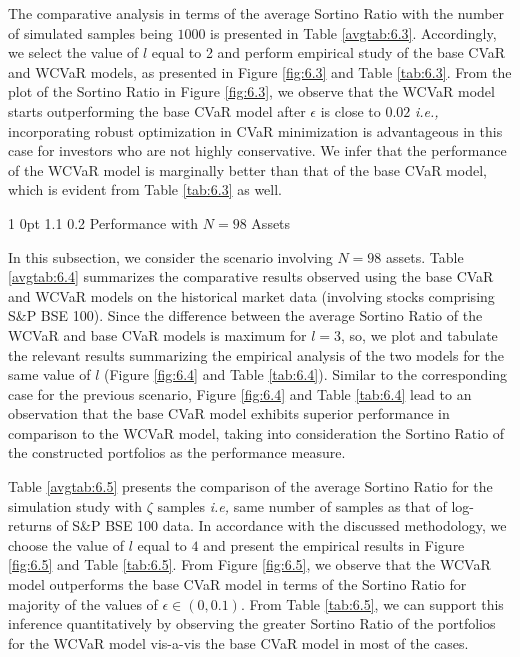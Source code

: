 \documentclass[12pt]{article}
\makeatletter
\numberwithin{equation}{section}
\renewcommand{\subsubsection}{
  \@startsection
  {subsubsection}%
  {1}%
  {0pt}%
  {1.1\baselineskip}%
  {0.2\baselineskip}%
  {\sc \centering}%
}
\makeatother
\begin{document}
The comparative analysis in terms of the average Sortino Ratio with the number of simulated samples being $1000$ is presented in Table \ref{avgtab:6.3}. Accordingly, we select the value of $l$ equal to 2 and perform empirical study of the base CVaR and WCVaR models, as presented in Figure \ref{fig:6.3} and Table \ref{tab:6.3}. From the plot of the Sortino Ratio in Figure \ref{fig:6.3}, we observe that the WCVaR model starts outperforming the base CVaR model after $\epsilon$ is close to $0.02$ \textit{i.e.,} incorporating robust optimization in CVaR minimization is advantageous in this case for investors who are not highly conservative. We infer that the performance of the WCVaR model is marginally better than that of the base CVaR model, which is evident from Table \ref{tab:6.3} as well.

\subsubsection{Performance with $N=98$ Assets}

In this subsection, we consider the scenario involving $N=98$ assets. Table \ref{avgtab:6.4} summarizes the comparative results observed using the base
CVaR and WCVaR models on the historical market data (involving stocks comprising S\&P BSE 100). Since the difference between the average Sortino Ratio of the
WCVaR and base CVaR models is maximum for $l=3$, so, we plot and tabulate the relevant results summarizing the empirical analysis of the two models for the same value of $l$ (Figure \ref{fig:6.4} and Table \ref{tab:6.4}). Similar to the corresponding case for the previous scenario, Figure \ref{fig:6.4} and Table \ref{tab:6.4} lead to an observation that the base CVaR model exhibits superior performance in comparison to the WCVaR model, taking into consideration the Sortino Ratio of the constructed portfolios as the performance measure.

Table \ref{avgtab:6.5} presents the comparison of the average Sortino Ratio for the simulation study with $\zeta$ samples \textit{i.e,} same number of samples as that of log-returns of S\&P BSE 100 data. In accordance with the discussed methodology, we choose the value of $l$ equal to $4$ and present the empirical results in Figure \ref{fig:6.5} and Table \ref{tab:6.5}. From Figure \ref{fig:6.5}, we observe that the WCVaR model outperforms the base CVaR model in terms of the Sortino Ratio for majority of the values of $\epsilon \in (0,0.1)$. From Table \ref{tab:6.5}, we can support this inference quantitatively by observing the greater Sortino Ratio of the portfolios for the WCVaR model vis-a-vis the base CVaR model in most of the cases.
\end{document}
